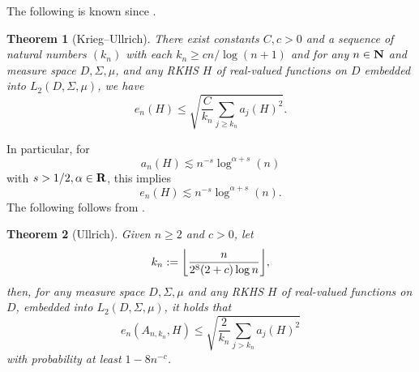 \documentclass[12pt, oneside]{amsart}
\newtheorem{thm}{Theorem}[section]
\theoremstyle{definition}
\theoremstyle{remark}
\numberwithin{equation}{section}
\begin{document}
The following is known since \cite{Krieg_2020}.
\begin{thm}[Krieg--Ullrich]\label{thm:kriegUllrich2020}
    There exist constants \(C, c > 0\) and a sequence of natural numbers \((k_n)\) with each \(k_n \geq cn/\log(n+1)\) and for any \(n \in \mathbf{N}\) and measure space \(D, \Sigma, \mu\), and any RKHS \(H\) of real-valued functions on \(D\) embedded into \(L_2(D, \Sigma, \mu)\), we have \[
        e_n(H) \leq \sqrt{\frac{C}{k_n} \sum_{j \geq k_n} a_j(H)^2}.
    \]
\end{thm}
In particular, for 
\begin{equation}\label{eq:orderOfApproximationNumbers}
    a_n(H) \lesssim n^{-s} \log^{\alpha + s}(n)
\end{equation}
with \(s > 1/2, \alpha \in \mathbf{R}\), this implies \[
    e_n(H) \lesssim n^{-s} \log^{\alpha+s}(n).
\]
The following follows from \cite{Ullrich_2020}.
\begin{thm}[Ullrich]
    Given \(n \geq 2\) and \(c > 0\), let \[
        k_n := \floor*{\frac{n}{2^8 (2+c) \log n}},
    \]
    then, for any measure space \(D, \Sigma, \mu\) and any RKHS \(H\) of real-valued functions on \(D\), embedded into \(L_2(D, \Sigma, \mu)\), it holds that \[
        e_n\left(A_{n, k_n}, H\right) \leq \sqrt{ \frac{2}{k_n} \sum_{j > k_n} a_j(H)^2 }
    \]
    with probability at least \(1-8n^{-c}\).
\end{thm}
\end{document}
